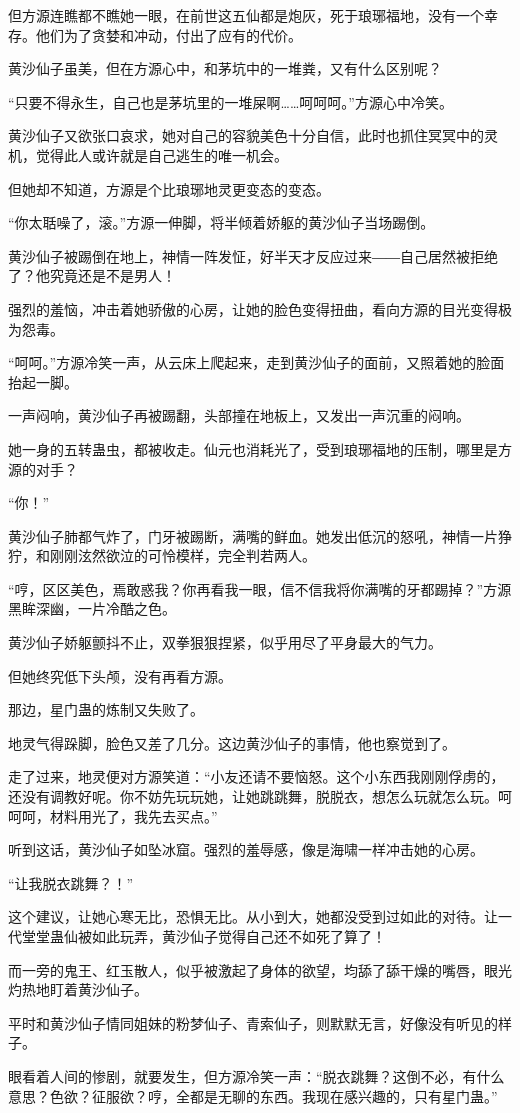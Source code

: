 \begin{this_body}
但方源连瞧都不瞧她一眼，在前世这五仙都是炮灰，死于琅琊福地，没有一个幸存。他们为了贪婪和冲动，付出了应有的代价。

黄沙仙子虽美，但在方源心中，和茅坑中的一堆粪，又有什么区别呢？

“只要不得永生，自己也是茅坑里的一堆屎啊……呵呵呵。”方源心中冷笑。

黄沙仙子又欲张口哀求，她对自己的容貌美色十分自信，此时也抓住冥冥中的灵机，觉得此人或许就是自己逃生的唯一机会。

但她却不知道，方源是个比琅琊地灵更变态的变态。

“你太聒噪了，滚。”方源一伸脚，将半倾着娇躯的黄沙仙子当场踢倒。

黄沙仙子被踢倒在地上，神情一阵发怔，好半天才反应过来――自己居然被拒绝了？他究竟还是不是男人！

强烈的羞恼，冲击着她骄傲的心房，让她的脸色变得扭曲，看向方源的目光变得极为怨毒。

“呵呵。”方源冷笑一声，从云床上爬起来，走到黄沙仙子的面前，又照着她的脸面抬起一脚。

一声闷响，黄沙仙子再被踢翻，头部撞在地板上，又发出一声沉重的闷响。

她一身的五转蛊虫，都被收走。仙元也消耗光了，受到琅琊福地的压制，哪里是方源的对手？

“你！”

黄沙仙子肺都气炸了，门牙被踢断，满嘴的鲜血。她发出低沉的怒吼，神情一片狰狞，和刚刚泫然欲泣的可怜模样，完全判若两人。

“哼，区区美色，焉敢惑我？你再看我一眼，信不信我将你满嘴的牙都踢掉？”方源黑眸深幽，一片冷酷之色。

黄沙仙子娇躯颤抖不止，双拳狠狠捏紧，似乎用尽了平身最大的气力。

但她终究低下头颅，没有再看方源。

那边，星门蛊的炼制又失败了。

地灵气得跺脚，脸色又差了几分。这边黄沙仙子的事情，他也察觉到了。

走了过来，地灵便对方源笑道：“小友还请不要恼怒。这个小东西我刚刚俘虏的，还没有调教好呢。你不妨先玩玩她，让她跳跳舞，脱脱衣，想怎么玩就怎么玩。呵呵呵，材料用光了，我先去买点。”

听到这话，黄沙仙子如坠冰窟。强烈的羞辱感，像是海啸一样冲击她的心房。

“让我脱衣跳舞？！”

这个建议，让她心寒无比，恐惧无比。从小到大，她都没受到过如此的对待。让一代堂堂蛊仙被如此玩弄，黄沙仙子觉得自己还不如死了算了！

而一旁的鬼王、红玉散人，似乎被激起了身体的欲望，均舔了舔干燥的嘴唇，眼光灼热地盯着黄沙仙子。

平时和黄沙仙子情同姐妹的粉梦仙子、青索仙子，则默默无言，好像没有听见的样子。

眼看着人间的惨剧，就要发生，但方源冷笑一声：“脱衣跳舞？这倒不必，有什么意思？色欲？征服欲？哼，全都是无聊的东西。我现在感兴趣的，只有星门蛊。”

\end{this_body}


